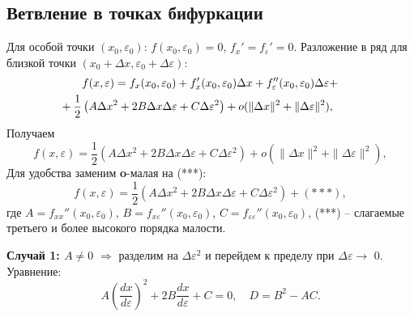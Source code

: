 	\subsection{Ветвление в точках бифуркации}
	
	Для особой точки \((x_0, \varepsilon_0)\): \( f(x_0, \varepsilon_0) = 0 \), \( f_x' = f_\varepsilon' = 0 \).  
	\newline
	Разложение в ряд для близкой точки \((x_0 + \Delta x, \varepsilon_0 + \Delta \varepsilon)\):
	\begin{equation}
		\begin{aligned}
			& f(x, \varepsilon) = f_x(x_0, \varepsilon_0) + f_x'(x_0, \varepsilon_0)\Delta x + f_\varepsilon''(x_0, \varepsilon_0)\Delta \varepsilon + \\ 
			& \hspace{-2em}+ \frac{1}{2} \left( A \Delta x^2 + 2 B \Delta x \Delta \varepsilon + C \Delta \varepsilon^2 \right) + o(\|\Delta x\|^2 + \|\Delta \varepsilon\|^2),
		\end{aligned}
	\end{equation}
	Получаем
	\vspace{-1em}
	\begin{equation}
		f(x, \varepsilon) = \frac{1}{2} \left( A \Delta x^2 + 2 B \Delta x \Delta \varepsilon + C \Delta \varepsilon^2 \right) + o(\|\Delta x\|^2 + \|\Delta \varepsilon\|^2),
	\end{equation}
	\vspace{-0.5em}
	Для удобства заменим \textbf{o}-малая на (***):
	\begin{equation}
		f(x, \varepsilon) = \frac{1}{2} \left( A \Delta x^2 + 2 B \Delta x \Delta \varepsilon + C \Delta \varepsilon^2 \right) + (***),
	\end{equation}
	где \( A = f_{xx}''(x_0, \varepsilon_0) \), \( B = f_{x\varepsilon}''(x_0, \varepsilon_0) \), \( C = f_{\varepsilon\varepsilon}''(x_0, \varepsilon_0) \), 
	\newline
	(***) – слагаемые третьего и более высокого порядка малости.
	\par
	\vspace{0.5em}
	\textbf{Случай 1: \( A \neq 0 \)} \(\Rightarrow\) разделим на \(\Delta \varepsilon^2 \) и перейдем к пределу при \(\Delta \varepsilon \rightarrow\) 0.
	\newline
	Уравнение:
	\begin{equation}
		A \left( \frac{d x}{d \varepsilon} \right)^2 + 2 B \frac{d x}{d \varepsilon} + C = 0, \quad D = B^2 - A C.
	\end{equation}
